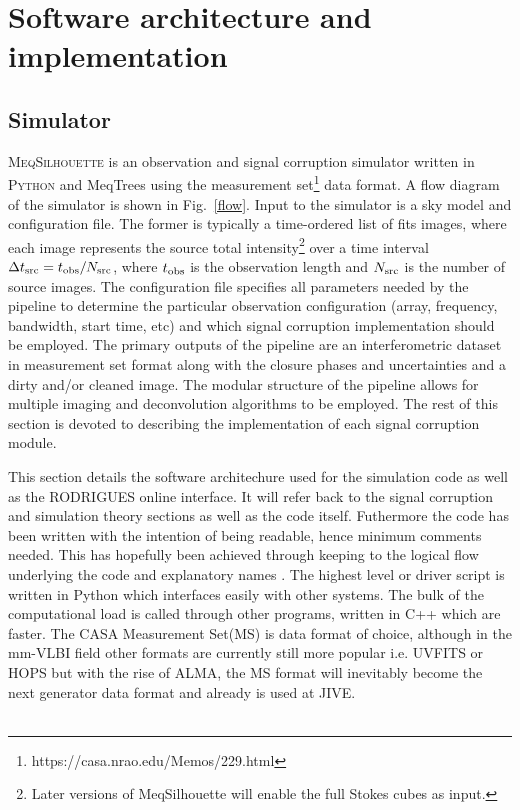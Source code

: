 \chapter{Software architecture and implementation}

\section{Simulator}\label{sec:sim}
\textsc{MeqSilhouette} is an observation and signal corruption simulator written in \textsc{Python} and {\sc MeqTrees} using the  {\sc measurement set}\footnote{https://casa.nrao.edu/Memos/229.html}  data format. A flow diagram of the simulator is shown in Fig.~\ref{flow}. Input to the simulator is a sky model and configuration file. The former is typically a time-ordered list of {\sc fits} images, where each image represents the source total intensity\footnote{Later versions of {\sc MeqSilhouette} will enable the full Stokes cubes as input.} over a time interval $\Delta t_{\rm src} = t_{\rm obs}/N_{\rm src}$, where $t_{\rm obs}$ is the observation length and $N_{\rm src}$ is the number of source images. The configuration file specifies all parameters needed by the pipeline to determine the particular observation configuration (array, frequency, bandwidth, start time, etc) and which signal corruption implementation should be employed. The primary outputs of the pipeline are an interferometric dataset in {\sc measurement set} format along with the closure phases and uncertainties and a dirty and/or cleaned image. The modular structure of the pipeline allows for multiple imaging and deconvolution algorithms to be employed.  The rest of this section is devoted to describing the implementation of each signal corruption module.

This section details the software architechure used for the simulation code as well as the RODRIGUES online interface. It will refer back to the signal corruption and simulation theory sections as well as the code itself. Futhermore the code has been written with the intention of being readable, hence minimum comments needed. This has hopefully been achieved through keeping to the logical flow underlying the code and explanatory names .  The highest level or driver script is written in Python which interfaces easily with other systems.  The bulk of the computational load is called through other programs, written in C++ which are faster. The CASA Measurement Set(MS) is data format of choice, although in the mm-VLBI field other formats are currently still more popular i.e. UVFITS or HOPS but with the rise of ALMA, the MS format will inevitably become the next generator data format and already is used at JIVE. \\
~\\


